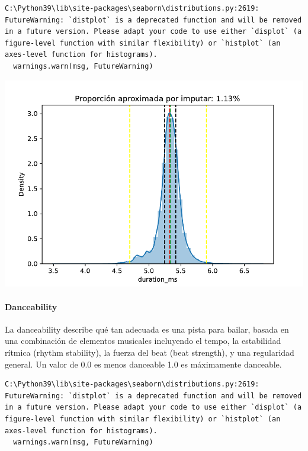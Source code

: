 \documentclass[
  letterpaper,
  DIV=11,
  numbers=noendperiod]{scrartcl}
\let\oldparagraph\paragraph
\renewcommand{\paragraph}[1]{\oldparagraph{#1}\mbox{}}
\begin{document}
\begin{verbatim}
C:\Python39\lib\site-packages\seaborn\distributions.py:2619: FutureWarning: `distplot` is a deprecated function and will be removed in a future version. Please adapt your code to use either `displot` (a figure-level function with similar flexibility) or `histplot` (an axes-level function for histograms).
  warnings.warn(msg, FutureWarning)
\end{verbatim}

\includegraphics{informe_01_files/figure-pdf/unnamed-chunk-20-11.pdf}

\hypertarget{danceability}{%
\paragraph{Danceability}\label{danceability}}

La danceability describe qué tan adecuada es una pista para bailar,
basada en una combinación de elementos musicales incluyendo el tempo, la
estabilidad rítmica (rhythm stability), la fuerza del beat (beat
strength), y una regularidad general. Un valor de 0.0 es menos danceable
1.0 es máximamente danceable.

\begin{verbatim}
C:\Python39\lib\site-packages\seaborn\distributions.py:2619: FutureWarning: `distplot` is a deprecated function and will be removed in a future version. Please adapt your code to use either `displot` (a figure-level function with similar flexibility) or `histplot` (an axes-level function for histograms).
  warnings.warn(msg, FutureWarning)
\end{verbatim}
\end{document}
